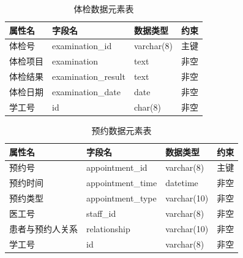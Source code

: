 \documentclass{article}
\begin{document}
\begin{table}[H]
    \centering
    \begin{tabularx}{\textwidth}{|>{\raggedright\arraybackslash}X|>{\raggedright\arraybackslash}X|>{\raggedright\arraybackslash}X|>{\raggedright\arraybackslash}X|}
    \toprule
    \textbf{属性名} & \textbf{字段名} & \textbf{数据类型} & \textbf{约束} \\ \midrule
    体检号 & examination\_id & varchar(8) & 主键 \\ \midrule
    体检项目 & examination & text & 非空 \\ \midrule
    体检结果 & examination\_result & text & 非空 \\ \midrule
    体检日期 & examination\_date & date & 非空 \\ \midrule
    学工号 & id & char(8) & 非空 \\ \bottomrule
    \end{tabularx}
    \caption{体检数据元素表}
    \label{tab:examination_elements}
\end{table}

\begin{table}[H]
    \centering
    \begin{tabularx}{\textwidth}{|>{\raggedright\arraybackslash}X|>{\raggedright\arraybackslash}X|>{\raggedright\arraybackslash}X|>{\raggedright\arraybackslash}X|}
    \toprule
    \textbf{属性名} & \textbf{字段名} & \textbf{数据类型} & \textbf{约束} \\ \midrule
    预约号 & appointment\_id & varchar(8) & 主键 \\ \midrule
    预约时间 & appointment\_time & datetime & 非空 \\ \midrule
    预约类型 & appointment\_type & varchar(10) & 非空 \\ \midrule
    医工号 & staff\_id & varchar(8) & 非空 \\ \midrule
    患者与预约人关系 & relationship & varchar(10) & 非空 \\ \midrule
    学工号 & id & varchar(8) & 非空 \\ \bottomrule
    \end{tabularx}
    \caption{预约数据元素表}
    \label{tab:appointment_elements}
\end{table}
\end{document}
